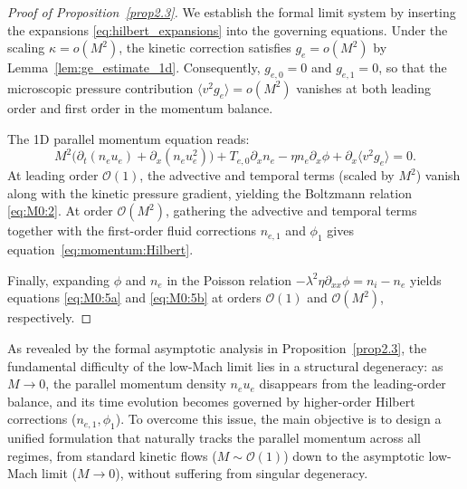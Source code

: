 \documentclass[pdflatex,final,10pt]{article}
\begin{document}
\begin{proof}[Proof of Proposition~\ref{prop2.3}] \label{prop2.3pf}
We establish the formal limit system by inserting the expansions \eqref{eq:hilbert_expansions} into the governing equations.
Under the scaling $\kappa = o(M^2)$, the kinetic correction satisfies $g_e = o(M^2)$ by Lemma~\ref{lem:ge_estimate_1d}. Consequently, $g_{e,0} = 0$ and $g_{e,1} = 0$, so that the microscopic pressure contribution $\langle v^2 g_e \rangle = o(M^2)$ vanishes at both leading order and first order in the momentum balance.

The 1D parallel momentum equation reads:
\begin{equation*}
    M^2 \Big( \partial_t(n_e u_e) + \partial_x(n_e u_e^2) \Big) + T_{e,0} \partial_x n_e - \eta n_e \partial_x \phi + \partial_x \langle v^2 g_e \rangle = 0.
\end{equation*}
At leading order $\mathcal{O}(1)$, the advective and temporal terms (scaled by $M^2$) vanish along with the kinetic pressure gradient, yielding the Boltzmann relation \eqref{eq:M0:2}. At order $\mathcal{O}(M^2)$, gathering the advective and temporal terms together with the first-order fluid corrections $n_{e,1}$ and $\phi_1$ gives equation~\eqref{eq:momentum:Hilbert}.

Finally, expanding $\phi$ and $n_e$ in the Poisson relation $-\lambda^2 \eta \partial_{xx} \phi = n_i - n_e$ yields equations \eqref{eq:M0:5a} and \eqref{eq:M0:5b} at orders $\mathcal{O}(1)$ and $\mathcal{O}(M^2)$, respectively.
\end{proof}


As revealed by the formal asymptotic analysis in Proposition~\ref{prop2.3}, the fundamental difficulty of the low-Mach limit lies in a structural degeneracy: as $M \to 0$, the parallel momentum density $n_e u_e$ disappears from the leading-order balance, and its time evolution becomes governed by higher-order Hilbert corrections ($n_{e,1}, \phi_1$). 
To overcome this issue, the main objective is to design a unified formulation that naturally tracks the parallel momentum across all regimes, from standard kinetic flows ($M \sim \mathcal{O}(1)$) down to the asymptotic low-Mach limit ($M \to 0$), without suffering from singular degeneracy. 
\end{document}
